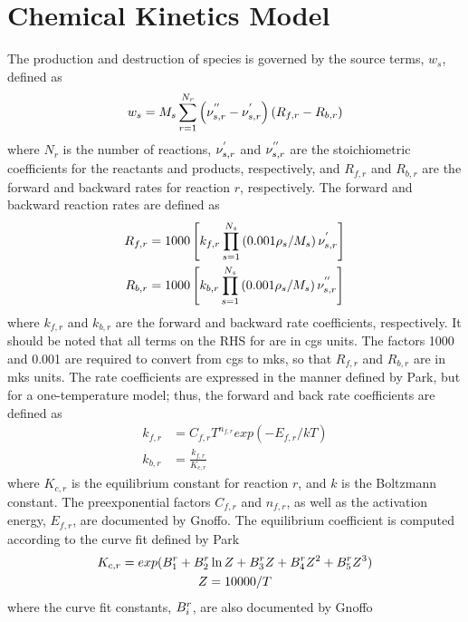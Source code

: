 \section{Chemical Kinetics Model}

The production and destruction of species is governed by the source terms,
$w_s$, defined as
\begin{equation}
  w_s = M_s \sum_{r=1}^{N_r}\left( \nu_{s,r}^{''} - \nu_{s,r}^{'} \right)
        \left( R_{f,r} - R_{b,r} \right)
  \label{source-term}
\end{equation}
where $N_r$ is the number of reactions, $\nu_{s,r}^{'}$ and $\nu_{s,r}^{''}$ are the
stoichiometric coefficients for the reactants and products, respectively, and
$R_{f,r}$ and $R_{b,r}$ are the forward and backward rates for reaction
$r$, respectively.  The forward and backward reaction rates are defined as
\begin{align}
  R_{f,r} &= 1000\left[ k_{f,r}\prod_{s=1}^{N_s}\left( 0.001\rho_s/M_s
  \right)\nu_{s,r}^{'} \right] \label{forward-rate} \\
  R_{b,r} &= 1000\left[ k_{b,r}\prod_{s=1}^{N_s}\left( 0.001\rho_s/M_s
  \right)\nu_{s,r}^{''} \right]
  \label{backward-rate}
\end{align}
where $k_{f,r}$ and $k_{b,r}$ are the forward and backward rate coefficients,
respectively.  It should be noted that all terms on the RHS for
 are in cgs units.  The factors 1000 and
0.001 are required to convert from cgs to mks, so that $R_{f,r}$ and $R_{b,r}$
are in mks units.  The rate coefficients are expressed in the manner defined by
Park\cite{park}, but for a one-temperature model; thus, the forward and back
rate coefficients are defined as
\begin{align}
  k_{f,r} &= C_{f,r}T^{n_{f,r}}exp\left( -E_{f,r}/kT \right)
  \label{forward-rate-coef} \\
  k_{b,r} &= \frac{k_{f,r}}{K_{c,r}}
  \label{backward-rate-coef}
\end{align}
where $K_{c,r}$ is the equilibrium constant for reaction $r$, and $k$ is the
Boltzmann constant.  The preexponential factors $C_{f,r}$ and $n_{f,r}$, as well
as the activation energy, $E_{f,r}$, are documented by Gnoffo\cite{gnoffo-tp}.
The equilibrium coefficient is computed according to the curve fit defined by
Park\cite{park1985convergence}
\begin{gather}
  K_{c,r} = exp(B_{1}^{r} + B_{2}^{r}\ln{Z} + B_{3}^{r}Z + B_{4}^{r}Z^2 + B_{5}^{r}Z^3) \\
  Z = 10000/T
\end{gather}
where the curve fit constants, $B_{i}^{r}$, are also documented by
Gnoffo\cite{gnoffo-tp}
